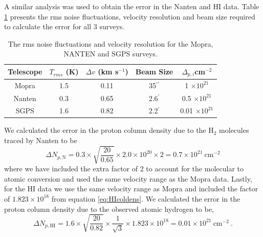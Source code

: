 \documentclass[12pt,a4paper]{article}
\begin{document}
A similar analysis was used to obtain the error in the Nanten and HI data. 
Table \ref{tab:erroranal} presents the rms noise fluctuations, velocity resolution and beam size required to calculate the error for all 3 surveys. 
\begin{table}[H] 
	\centering
	\begin{tabular}{c|cccc}
		\toprule
		Telescope & $T_{rms}$ (K) & $\Delta v$ (km s$^{-1}$) & Beam Size & $\Delta_{p,i} $cm$^{-2}$ \\
		\hline 
		Mopra & 1.5 & 0.11 & 35$^{\prime \prime}$ & 1 $\times 10^{21}$ \\
		Nanten & 0.3 & 0.65 & 2.6$^\prime$ & 0.5 $\times 10^{21}$\\
		SGPS & 1.6 & 0.82 & 2.2$^\prime$ & 0.01 $\times 10^{21}$\\
		\bottomrule
	\end{tabular} 
	\caption{The rms noise fluctuations and velocity resolution for the Mopra, NANTEN and SGPS surveys.}
	\label{tab:erroranal}
\end{table}
We calculated the error in the proton column density due to the H$_2$ molecules traced by Nanten to be
\begin{equation}
\Delta N_{p,\mathrm{N}} = 0.3 \times \sqrt{\dfrac{20}{0.65}}  \times 2.0 \times 10^{20} \times 2 = 0.7 \times 10^{21} \ \mathrm{cm}^{-2}
\end{equation}
where we have included the extra factor of 2 to account for the molecular to atomic conversion and used the same velocity range as the Mopra data. 
Lastly, for the HI data we use the same velocity range as Mopra and included the factor of $1.823 \times 10^{18}$ from equation \ref{eq:HIcoldens}. 
We calculated the error in the proton column density due to the observed atomic hydrogen to be,
\begin{equation}
\Delta N_{p,\mathrm{HI}} =  1.6 \times \sqrt{\dfrac{20}{0.82}} \times \dfrac{1}{\sqrt{3}} \times  1.823 \times 10^{18} = 0.01 \times 10^{21} \ \mathrm{cm}^{-2} \ .
\end{equation} 
\end{document}
